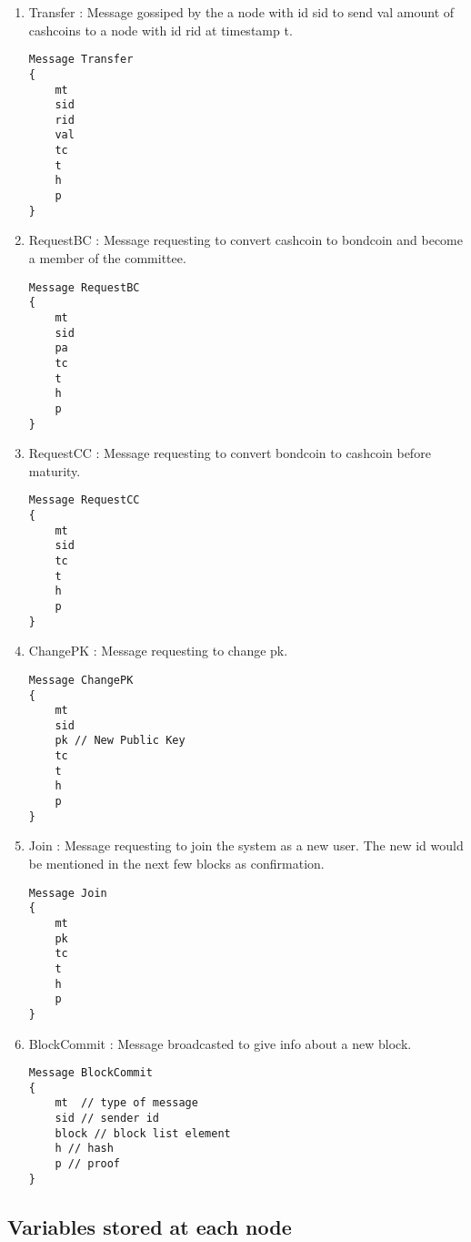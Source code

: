 \begin{enumerate}
    \item Transfer : Message gossiped by the a node with id sid to send val amount of cashcoins to a node with id rid at timestamp t.
    \begin{verbatim}
Message Transfer
{
    mt
    sid
    rid
    val
    tc
    t
    h
    p
}
    \end{verbatim}
    \item RequestBC : Message requesting to convert cashcoin to bondcoin and become a member of the committee.
    \begin{verbatim}
Message RequestBC
{
    mt
    sid
    pa
    tc
    t
    h
    p
}
    \end{verbatim}
    \item RequestCC : Message requesting to convert bondcoin to cashcoin before maturity.
    \begin{verbatim}
Message RequestCC
{
    mt
    sid
    tc
    t
    h
    p
}
    \end{verbatim}
    \item ChangePK : Message requesting to change pk.
    \begin{verbatim}
Message ChangePK
{
    mt
    sid
    pk // New Public Key
    tc
    t
    h
    p
}
    \end{verbatim}
    \item Join : Message requesting to join the system as a new user. The new id would be mentioned in the next few blocks as confirmation.
    \begin{verbatim}
Message Join
{
    mt
    pk
    tc
    t
    h
    p
}
    \end{verbatim}
    \item BlockCommit : Message broadcasted to give info about a new block.
    \begin{verbatim}
Message BlockCommit
{
    mt  // type of message
    sid // sender id
    block // block list element
    h // hash
    p // proof
}
    \end{verbatim}
\end{enumerate}

\subsection{Variables stored at each node}

